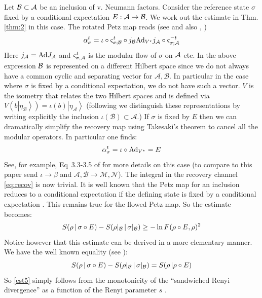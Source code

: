 \documentclass[english,a4paper,12pt]{article}
\def\cA{{\mathfrak A}}
\def\cB{{\mathfrak B}}
\newcommand{\ca}[1]{{\cal #1}}
\newcommand{\ben}{\begin{equation}}
\newcommand{\een}{\end{equation}}
\def\cA{{\ca A}}
\def\cB{{\ca B}}
\renewcommand{\log}{\operatorname{ln}}
\begin{document}
Let $\cB \subset \cA$ be an inclusion of v. Neumann factors.
Consider the reference state $\sigma$ fixed by a conditional expectation $E: \cA \to \cB$. 
We work out the estimate in Thm. \ref{thm:2} in this case. The rotated Petz map reads (see \cite{Faulkner:2020iou} and also \cite{AC}, \cite{Petz1993})
\ben
\alpha^t_\sigma = 
\iota \circ \varsigma_{\sigma; \cB}^{t} \circ j_{\cB} {\rm Ad}_{V^\star}  j_{\cA} \circ \varsigma_{\sigma; \cA}^{-t} 
\een
Here $j_\cA = {\rm Ad} J_\cA$ and $\varsigma_{\sigma,\cA}^t$ is the modular flow of $\sigma$ on $\cA$ etc.
In the above expression $\cB$ is represented on a different Hilbert space
since we do not always have a common cyclic and separating vector for $\mathcal{A},\mathcal{B}$. 
In particular in the case where $\sigma$ is fixed by a conditional expectation, we do not have such a vector.
$V$ is the isometry that relates the two Hilbert spaces
and is defined via $V(b \left| \eta_{\mathcal{B}} \right>) = \iota(b) \left| \eta_{\mathcal{A}} \right>$ (following \cite{Faulkner:2020iou} we distinguish these representations by writing explicitly the inclusion
$\iota(\mathcal{B}) \subset \mathcal{A}$.) If $\sigma$ is fixed by $E$ then we can dramatically simplify the recovery map 
using Takesaki's theorem \cite{Takesaki2} to cancel all the modular operators.
In particular one finds:
\ben
\alpha^t_\sigma = \iota \circ {\rm Ad}_{V^\star} = E
\een
See, for example, Eq~3.3-3.5 of \cite{Faulkner:2020hzi} for more details on this case (to compare to this paper send $\iota \rightarrow \beta$ and $\mathcal{A}, \mathcal{B} \rightarrow \mathcal{M} , \mathcal{N}$). 
The integral in the recovery channel  \eqref{eq:recov} is now trivial. It is well known that
the Petz map for an inclusion reduces to a conditional expectation if the defining state is fixed by a conditional expectation \cite{Petz1}. This remains true for the flowed Petz map. 
So the estimate becomes:
\begin{equation}
\label{est5}
S(\rho \, | \, \sigma \circ E) - S(\rho|_{\cB} \, | \, \sigma|_{\cB})  \geq - \log F( \rho \circ E, \rho)^2
\end{equation}
Notice however that this estimate can be derived in a more elementary manner. 
We have the well known equality (see \cite{Petz1993}):
\begin{equation}
S(\rho \, | \, \sigma \circ E) - S(\rho|_{\cB} \, | \, \sigma|_{\cB})
= S(\rho \, | \rho \circ E) 
\end{equation}
So \eqref{est5} simply follows from the monotonicity of the ``sandwiched Renyi divergence''
as a function of the Renyi parameter $s$ \cite{Berta2}. 
\end{document}
